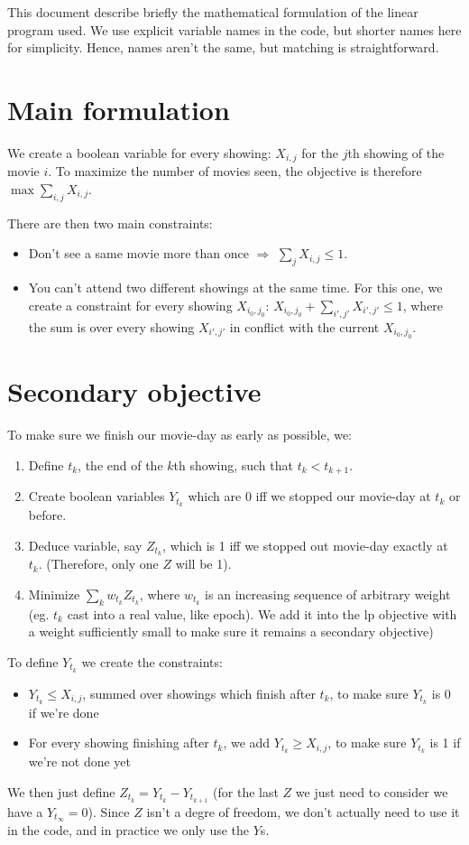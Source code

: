 \documentclass[a4paper, 10pt]{article}
\begin{document}
This document describe briefly the mathematical formulation of the linear program used. We use explicit variable names in the code, but shorter names here for simplicity. Hence, names aren't the same, but matching is straightforward.

\section{Main formulation}
We create a boolean variable for every showing: $X_{i,j}$ for the $j$th showing of the movie $i$.
To maximize the number of movies seen, the objective is therefore $\max \sum_{i,j} X_{i,j}$.

There are then two main constraints:
\begin{itemize}
  \item Don't see a same movie more than once $\Rightarrow$ $\sum_j X_{i,j} \leq 1$.
  \item You can't attend two different showings at the same time. For this one, we create a constraint for every showing $X_{i_0,j_0}$: $X_{i_0,j_0} + \sum_{i',j'} X_{i',j'} \leq 1$, where the sum is over every showing $X_{i',j'}$ in conflict with the current $X_{i_0,j_0}$. 
\end{itemize}

\section{Secondary objective}
To make sure we finish our movie-day as early as possible, we:
\begin{enumerate}
  \item Define $t_k$, the end of the $k$th showing, such that $t_k < t_{k+1}$. 
  \item Create boolean variables $Y_{t_k}$ which are 0 iff we stopped our movie-day at $t_k$ or before.
  \item Deduce variable, say $Z_{t_k}$, which is 1 iff we stopped out movie-day exactly at $t_k$. (Therefore, only one $Z$ will be 1).
  \item Minimize $\sum_k w_{t_k} Z_{t_k}$, where $w_{t_k}$ is an increasing sequence of arbitrary weight (eg. $t_k$ cast into a real value, like epoch). We add it into the lp objective with a weight sufficiently small to make sure it remains a secondary objective)
\end{enumerate}

To define $Y_{t_k}$ we create the constraints:
\begin{itemize}
  \item $Y_{t_k} \leq X_{i,j}$, summed over showings which finish after $t_k$, to make sure $Y_{t_k}$ is 0 if we're done
  \item For every showing finishing after $t_k$, we add $Y_{t_k} \geq X_{i,j}$, to make sure $Y_{t_k}$ is 1 if we're not done yet
\end{itemize}

We then just define $Z_{t_k} = Y_{t_k} - Y_{t_{k+1}}$ (for the last $Z$ we just need to consider we have a $Y_{t_\infty} = 0$).
Since $Z$ isn't a degre of freedom, we don't actually need to use it in the code, and in practice we only use the $Y$s.
\end{document}
